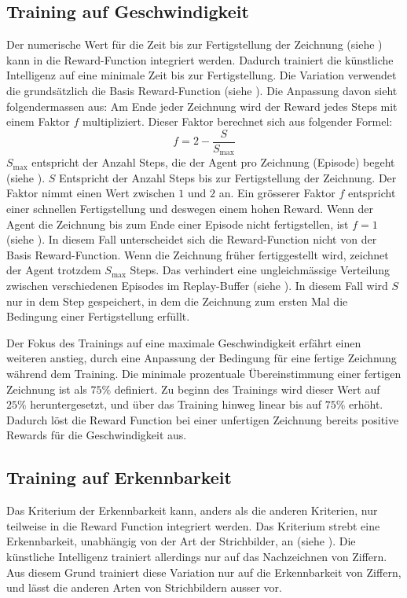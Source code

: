 \subsection{Training auf Geschwindigkeit}\label{sub:m_var_speed}
Der numerische Wert für die Zeit bis zur Fertigstellung der Zeichnung (siehe
) kann in die Reward-Function integriert werden.
Dadurch trainiert die künstliche Intelligenz auf eine minimale Zeit bis zur
Fertigstellung. Die Variation verwendet die grundsätzlich die Basis
Reward-Function (siehe ). Die Anpassung davon sieht
folgendermassen aus: Am Ende jeder Zeichnung wird der Reward jedes Steps mit
einem Faktor $f$ multipliziert. Dieser Faktor berechnet sich aus folgender
Formel:
\[ f = 2 - \frac{S}{S_{\max}} \]
$S_{\max}$ entspricht der Anzahl Steps, die der Agent pro Zeichnung (Episode)
begeht (siehe ). $S$ Entspricht der Anzahl Steps
bis zur Fertigstellung der Zeichnung. Der Faktor nimmt einen Wert zwischen $1$
und $2$ an. Ein grösserer Faktor $f$ entspricht einer schnellen Fertigstellung
und deswegen einem hohen Reward. Wenn der Agent die Zeichnung bis zum Ende einer
Episode nicht fertigstellen, ist $f = 1$ (siehe ). In
diesem Fall unterscheidet sich die Reward-Function nicht von der Basis
Reward-Function. Wenn die Zeichnung früher fertiggestellt wird, zeichnet der
Agent trotzdem $S_{\max}$ Steps. Das verhindert eine ungleichmässige Verteilung
zwischen verschiedenen Episodes im Replay-Buffer (siehe ).
In diesem Fall wird $S$ nur in dem Step gespeichert, in dem die Zeichnung zum
ersten Mal die Bedingung einer Fertigstellung erfüllt.   

Der Fokus des Trainings auf eine maximale Geschwindigkeit erfährt einen weiteren
anstieg, durch eine Anpassung der Bedingung für eine fertige Zeichnung während
dem Training. Die minimale prozentuale Übereinstimmung einer fertigen Zeichnung
ist als $75\%$ definiert. Zu beginn des Trainings wird dieser Wert auf $25\%$  %
heruntergesetzt, und über das Training hinweg linear bis auf $75\%$ erhöht.
Dadurch löst die Reward Function bei einer unfertigen Zeichnung bereits positive
Rewards für die Geschwindigkeit aus.


\subsection{Training auf Erkennbarkeit}
\label{sub:m_var_rec}
Das Kriterium der Erkennbarkeit kann, anders als die anderen Kriterien, nur
teilweise in die Reward Function integriert werden. Das Kriterium strebt eine
Erkennbarkeit, unabhängig von der Art der Strichbilder, an (siehe
). Die künstliche Intelligenz trainiert allerdings nur
auf das Nachzeichnen von Ziffern. Aus diesem Grund trainiert diese Variation nur
auf die Erkennbarkeit von Ziffern, und lässt die anderen Arten von Strichbildern
ausser vor. 

